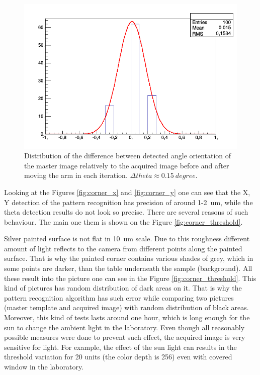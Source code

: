 \begin{figure}[ht]\centering
\includegraphics[width=0.8\linewidth]{Data/Precision_tests/Corner_c_theta.png}
\caption{Distribution of the difference between detected angle orientation of the master image relatively to the acquired image before and after moving the arm in each iteration. $\Delta theta \approx 0.15 ~degree$. }
\label{fig:corner_theta}
\end{figure}

Looking at the Figures \ref{fig:corner_x} and \ref{fig:corner_y} one can see that the X, Y detection of the pattern recognition has precision of around 1-2~um, while the theta detection results do not look so precise. There are several reasons of such behaviour. The main one them is shown on the Figure \ref{fig:corner_threshold}.

Silver painted surface is not flat in 10~um scale. Due to this roughness different amount of light reflects to the camera from different points along the painted surface. That is why the painted corner contains various shades of grey, which in some points are darker, than the table underneath the sample (background). All these result into the picture one can see in the Figure \ref{fig:corner_threshold}. This kind of pictures has random distribution of dark areas on it. That is why the pattern recognition algorithm has such error while comparing two pictures (master template and acquired image) with random distribution of black areas. Moreover, this kind of tests lasts around one hour, which is long enough for the sun to change the ambient light in the laboratory. Even though all reasonably possible measures were done to prevent such effect, the acquired image is very sensitive for light. For example, the effect of the sun light can results in the threshold variation for 20 units (the color depth is 256) even with covered window in the laboratory.

